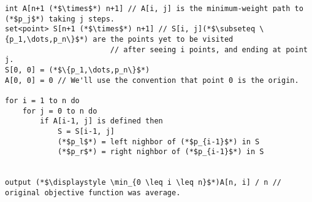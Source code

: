 \documentclass{article}
\begin{document}
\begin{lstlisting}
int A[n+1 (*$\times$*) n+1] // A[i, j] is the minimum-weight path to (*$p_j$*) taking j steps.
set<point> S[n+1 (*$\times$*) n+1] // S[i, j](*$\subseteq \{p_1,\dots,p_n\}$*) are the points yet to be visited
                        // after seeing i points, and ending at point j.
S[0, 0] = (*$\{p_1,\dots,p_n\}$*)
A[0, 0] = 0 // We'll use the convention that point 0 is the origin.

for i = 1 to n do
    for j = 0 to n do
        if A[i-1, j] is defined then
            S = S[i-1, j]
            (*$p_l$*) = left nighbor of (*$p_{i-1}$*) in S
            (*$p_r$*) = right nighbor of (*$p_{i-1}$*) in S
            

output (*$\displaystyle \min_{0 \leq i \leq n}$*)A[n, i] / n // original objective function was average.
\end{lstlisting}
\end{document}
